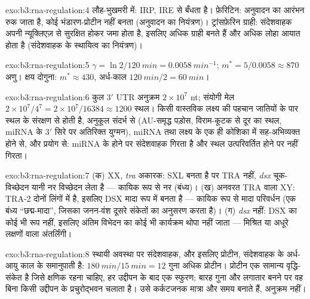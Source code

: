 \begin{solution}{exo:b3:rna-regulation:4}
लौह-भुखमरी में: IRP, IRE से बँधता है। फ़ेरिटिन: अनुवादन का आरंभन रुक
जाता है, कोई भंडारण-प्रोटीन नहीं बनता (अनुवादन का नियंत्रण)।
ट्रांसफ़ेरिन ग्राही: संदेशवाहक अपनी न्यूक्लिएज़ से सुरक्षित होकर जमा
होता है, इसलिए अधिक ग्राही बनते हैं और अधिक लोहा आयात होता है
(संदेशवाहक के स्थायित्व का नियंत्रण)।
\end{solution}

\begin{solution}{exo:b3:rna-regulation:5}
$\gamma = \ln 2/\qty{120}{min} = \qty{0.0058}{min^{-1}}$; $m^{*} =
5/0.0058 \approx 870$ अणु। क्षय दोगुना: $m^{*} \approx 430$,
अर्ध-काल $\qty{120}{min}/2 = \qty{60}{min}$।
\end{solution}

\begin{solution}{exo:b3:rna-regulation:6}
कुल 3$'$ UTR अनुक्रम $2\times 10^{7}$ nt; संयोगी मेल $2\times
10^{7}/4^{7} = 2\times 10^{7}/\num{16384} \approx \num{1200}$ स्थल।
किसी वास्तविक लक्ष्य की पहचान जातियों के पार स्थल के संरक्षण से होती
है, अनुकूल संदर्भ से (AU-समृद्ध पड़ोस, विराम-कूटक से दूर का स्थल,
miRNA के 3$'$ सिरे पर अतिरिक्त युग्मन), miRNA तथा लक्ष्य के एक ही
कोशिका में सह-अभिव्यक्त होने से, और प्रयोग से: miRNA के होने पर
संदेशवाहक गिरता है और स्थल उत्परिवर्तित होने पर नहीं गिरता।
\end{solution}

\begin{solution}{exo:b3:rna-regulation:7}
(क) XX, \emph{tra} अकारक: SXL बनता है पर TRA नहीं, \emph{dsx}
चूक-विच्छेदन यानी नर विच्छेदन लेता है --- कायिक रूप से नर (बंध्य)।
(ख) अनवरत TRA वाला XY: TRA-2 दोनों लिंगों में है, इसलिए DSX मादा रूप
में बनता है --- कायिक रूप से मादा परिवर्धन (एक बंध्य
``छद्म-मादा'', जिसका जनन-वंश दूसरे संकेतों का अनुसरण करता है)। (ग)
\emph{dsx} नहीं: DSX का कोई भी रूप नहीं, इसलिए अंतिम विभेदन का कोई भी
कार्यक्रम थोपा नहीं जाता --- मिश्रित या अधूरे लक्षणों वाला अंतर्लिंगी।
\end{solution}

\begin{solution}{exo:b3:rna-regulation:8}
स्थायी अवस्था पर संदेशवाहक, और इसलिए प्रोटीन, संदेशवाहक के अर्ध-आयु
काल के समानुपाती है: $\qty{180}{min}/\qty{15}{min} = 12$ गुना अधिक
प्रोटीन। प्रोटीन एक सामान्य वृद्धि-संकेत है जिसे क्षणिक रहना चाहिए,
हर उद्दीपन के बाद एक स्फुरण; बारह गुना और लगातार बनने पर वह बिना किसी
उद्दीपन के प्रचुरोद्भवन चलाता है। उसे कर्कटजनक मात्रा और समय बनाते
हैं, अनुक्रम नहीं।
\end{solution}

